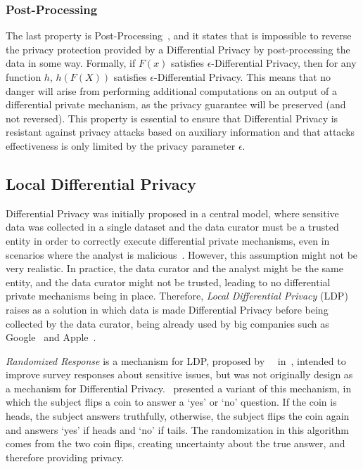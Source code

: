 \subsubsection{Post-Processing}\label{subsubsec:post_processing}

The last property is Post-Processing~\cite{DP_Book, AlgFoundationsDP}, and it states that is impossible to reverse the privacy protection provided by a Differential Privacy by post-processing the data in some way. Formally, if \(F(x)\) satisfies \(\epsilon\)-Differential Privacy, then for any function \(h\), \(h(F(X))\) satisfies \(\epsilon\)-Differential Privacy. This means that no danger will arise from performing additional computations on an output of a differential private mechanism, as the privacy guarantee will be preserved (and not reversed). This property is essential to ensure that Differential Privacy is resistant against privacy attacks based on auxiliary information and that attacks effectiveness is only limited by the privacy parameter \(\epsilon\).

\subsection{Local Differential Privacy}\label{subsec:local_differential_privacy}

Differential Privacy was initially proposed in a central model, where sensitive data was collected in a single dataset and the data curator must be a trusted entity in order to correctly execute differential private mechanisms, even in scenarios where the analyst is malicious~\cite{DP_Book}. However, this assumption might not be very realistic. In practice, the data curator and the analyst might be the same entity, and the data curator might not be trusted, leading to no differential private mechanisms being in place. Therefore, \textit{Local Differential Privacy} (LDP) raises as a solution in which data is made Differential Privacy before being collected by the data curator, being already used by big companies such as Google~\cite{RAPPOR} and Apple~\cite{AppleDP}. 

\textit{Randomized Response} is a mechanism for LDP, proposed by~\citeauthor{RandomizedResponse}~\cite{RandomizedResponse} in~\citeyear{RandomizedResponse}, intended to improve survey responses about sensitive issues, but was not originally design as a mechanism for Differential Privacy.~\citeauthor{AlgFoundationsDP} presented a variant of this mechanism, in which the subject flips a coin to answer a `yes' or `no' question. If the coin is heads, the subject answers truthfully, otherwise, the subject flips the coin again and answers `yes' if heads and `no' if tails. The randomization in this algorithm comes from the two coin flips, creating uncertainty about the true answer, and therefore providing privacy.


